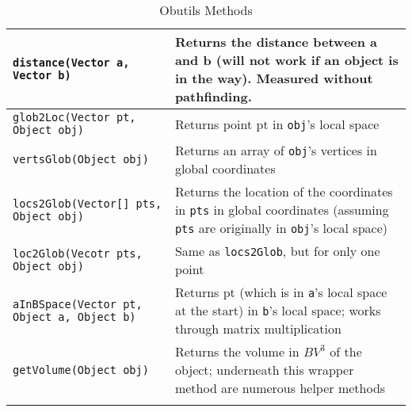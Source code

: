 \begin{longtable}{|p{5cm}|p{10cm}|}
	\texttt{distance(Vector a, Vector b)} & Returns the distance between a and b (will not work if an object is in the way). Measured without pathfinding. \\\hline
	
	\texttt{glob2Loc(Vector pt, Object obj)} & Returns point pt in \texttt{obj}'s local space \\\hline
	
	\texttt{vertsGlob(Object obj)} & Returns an array of \texttt{obj}'s vertices in global coordinates \\\hline
	
	\texttt{locs2Glob(Vector[] pts, Object obj)} & Returns the location of the coordinates in \texttt{pts} in global coordinates (assuming \texttt{pts} are originally in \texttt{obj}'s local space) \\\hline
	
	\texttt{loc2Glob(Vecotr pts, Object obj)} & Same as \texttt{locs2Glob}, but for only one point \\\hline
	
	\texttt{aInBSpace(Vector pt, Object a, Object b)} & Returns pt (which is in \texttt{a}'s local space at the start) in \texttt{b}'s local space; works through matrix multiplication \\\hline
	
	\texttt{getVolume(Object obj)} & Returns the volume in $BV^3$ of the object; underneath this wrapper method are numerous helper methods \\\hline
	\caption{Obutils Methods}\tabularnewline
\end{longtable}


\newpage

